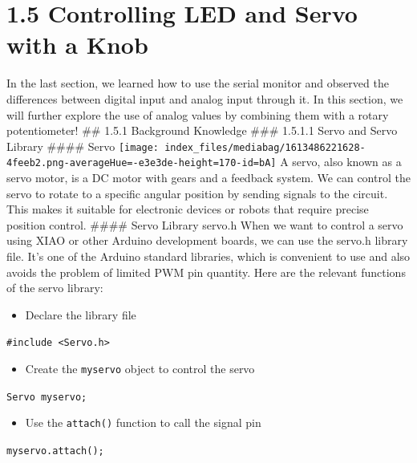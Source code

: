 \documentclass[
  letterpaper,
  DIV=11,
  numbers=noendperiod]{scrreprt}
\providecommand{\tightlist}{%
  \setlength{\itemsep}{0pt}\setlength{\parskip}{0pt}}\usepackage{longtable,booktabs,array}
\begin{document}
\hypertarget{controlling-led-and-servo-with-a-knob}{%
\chapter*{1.5 Controlling LED and Servo with a
Knob}\label{controlling-led-and-servo-with-a-knob}}


In the last section, we learned how to use the serial monitor and
observed the differences between digital input and analog input through
it. In this section, we will further explore the use of analog values by
combining them with a rotary potentiometer! \#\# 1.5.1 Background
Knowledge \#\#\# 1.5.1.1 Servo and Servo Library \#\#\#\# Servo
\texttt{[image: index\_files/mediabag/1613486221628-4feeb2.png-averageHue=-e3e3de-height=170-id=bA]}
A servo, also known as a servo motor, is a DC motor with gears and a
feedback system. We can control the servo to rotate to a specific
angular position by sending signals to the circuit. This makes it
suitable for electronic devices or robots that require precise position
control. \#\#\#\# Servo Library servo.h When we want to control a servo
using XIAO or other Arduino development boards, we can use the servo.h
library file. It's one of the Arduino standard libraries, which is
convenient to use and also avoids the problem of limited PWM pin
quantity. Here are the relevant functions of the servo library:

\begin{itemize}
\tightlist
\item
  Declare the library file
\end{itemize}

\texttt{\#include\ \textless{}Servo.h\textgreater{}}

\begin{itemize}
\tightlist
\item
  Create the \texttt{myservo} object to control the servo
\end{itemize}

\texttt{Servo\ myservo;}

\begin{itemize}
\tightlist
\item
  Use the \texttt{attach()} function to call the signal pin
\end{itemize}

\texttt{myservo.attach();}
\end{document}
